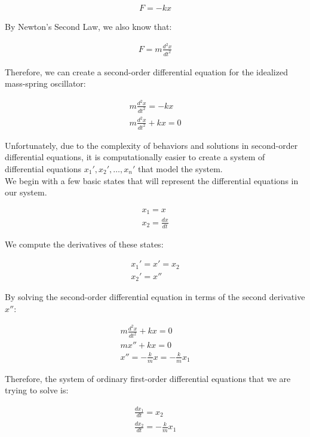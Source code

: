 \begin{gather*}
    F=-kx
\end{gather*}

By Newton's Second Law, we also know that:

\begin{gather*}
    F=m\frac{d^2 x}{dt^2}
\end{gather*}

Therefore, we can create a second-order differential equation for the idealized mass-spring oscillator:

\begin{gather*}
    m\frac{d^2 x}{dt^2}=-kx\\
    \boxed{m\frac{d^2 x}{dt^2}+kx=0}
\end{gather*}

Unfortunately, due to the complexity of behaviors and solutions in second-order differential equations, it is computationally easier to create a system of differential equations $x_1', x_2', \hdots, x_n'$ that model the system. \\

We begin with a few basic states that will represent the differential equations in our system.

\begin{gather*}
    x_1 = x\\
    x_2 = \frac{dx}{dt}
\end{gather*}

We compute the derivatives of these states:

\begin{gather*}
    x_1' = x' = x_2\\
    x_2' = x''
\end{gather*}

By solving the second-order differential equation in terms of the second derivative $x''$:

\begin{gather*}
    m\frac{d^2 x}{dt^2}+kx=0\\
    mx''+kx=0\\
    x''=-\frac{k}{m}x=-\frac{k}{m}x_1
\end{gather*}

Therefore, the system of ordinary first-order differential equations that we are trying to solve is:

\begin{gather*}
    \frac{dx_1}{dt}=x_2\\
    \frac{dx_2}{dt}=-\frac{k}{m}x_1
\end{gather*}

